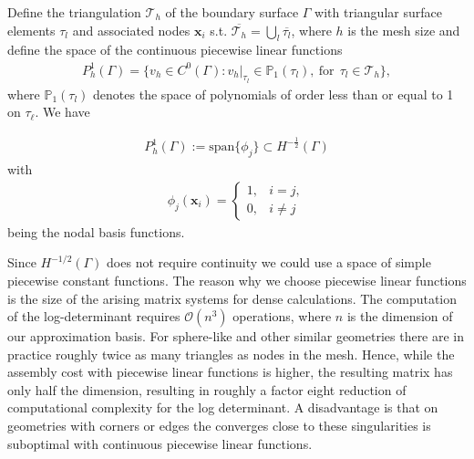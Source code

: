 Define the 
triangulation $\mathcal{T}_{h}$ of the boundary surface $\Gamma$ with triangular surface elements $\tau_{l}$ and associated nodes $\boldsymbol{x}_{i}$ 
s.t. $\overline{\mathcal{T}_{h}} = \bigcup_{l}\overline{\tau_{l}}$, where $h$ is the mesh size and define the space of the continuous piecewise linear functions
\begin{align*}
    P_{h}^{1}(\Gamma) = \{v_{h}\in C^{0}(\Gamma): v_{h}|_{\tau_{l}}\in\mathbb{P}_{1}(\tau_{l}), \ \text{for} \ \ \tau_{l}\in\mathcal{T}_{h}\},
\end{align*}
where $\mathbb{P}_{1}(\tau_{l})$ denotes the space of polynomials of order less than or equal to 1 on $\tau_{\ell}$. We have

\begin{align*}
    P_{h}^{1}(\Gamma) := \text{span}\{\phi_{j}\} \subset H^{-\frac{1}{2}}(\Gamma)
\end{align*}
with 
\begin{align*}
    \phi_{j}(\boldsymbol{x}_{i}) = \begin{cases}
        1, & i = j,\\
        0, & i\neq j
    \end{cases}
\end{align*}
being the nodal basis functions.

\begin{remark}
Since $H^{-1/2}(\Gamma)$ does not require continuity we could use a space of simple piecewise constant functions. The reason why we choose piecewise linear functions is the size of the arising matrix systems for dense calculations. The computation of the log-determinant requires $\mathcal{O}(n^3)$ operations, where $n$ is the dimension of our approximation basis. For sphere-like and other similar geometries there are in practice roughly twice as many triangles as nodes in the mesh. Hence, while the assembly cost with piecewise linear functions is higher, the resulting matrix has only half the dimension, resulting in roughly a factor eight reduction of computational complexity for the log determinant. A disadvantage is that on geometries with corners or edges the converges close to these singularities is suboptimal with continuous piecewise linear functions.
\end{remark}

